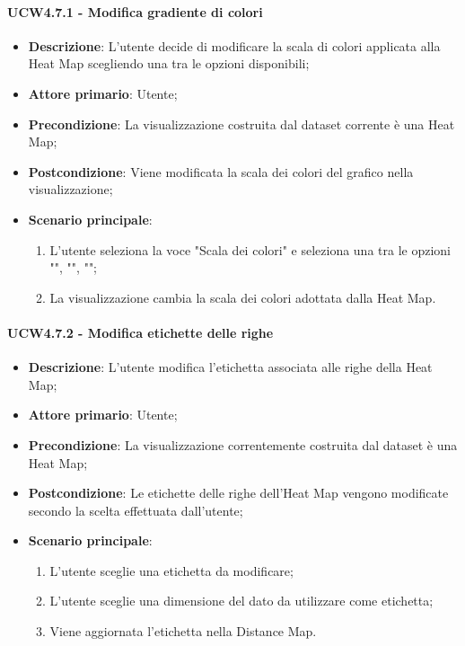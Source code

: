 \paragraph{UCW4.7.1 - Modifica gradiente di colori}
\label{par:ucw4.7.1}
\begin{itemize}
    \item \textbf{Descrizione}: L'utente decide di modificare la scala di colori applicata alla Heat Map scegliendo una tra le opzioni disponibili;

    \item \textbf{Attore primario}: Utente;

    \item \textbf{Precondizione}:   La visualizzazione costruita dal dataset corrente è una Heat Map;
    \item \textbf{Postcondizione}:  Viene modificata la scala dei colori del grafico nella visualizzazione;

	\item \textbf{Scenario principale}:
        \begin{enumerate}
            \item L'utente seleziona la voce "Scala dei colori" e seleziona una tra le opzioni  "", "", "";
            \item La visualizzazione cambia la scala dei colori adottata dalla Heat Map.
        \end{enumerate}
\end{itemize}

\paragraph{UCW4.7.2 - Modifica etichette delle righe}
\label{par:ucw4.7.3}
\begin{itemize}
    \item \textbf{Descrizione}:     L'utente modifica l'etichetta associata alle righe della Heat Map;
    \item \textbf{Attore primario}: Utente;
    \item \textbf{Precondizione}:   La visualizzazione correntemente costruita dal dataset è una Heat Map;
    \item \textbf{Postcondizione}:  Le etichette delle righe dell'Heat Map vengono modificate secondo la scelta effettuata dall'utente;
    \item \textbf{Scenario principale}:
    \begin{enumerate}
        \item L'utente sceglie una etichetta da modificare;
        \item L'utente sceglie una dimensione del dato da utilizzare come etichetta;
        \item Viene aggiornata l'etichetta nella Distance Map.
    \end{enumerate}
\end{itemize}

